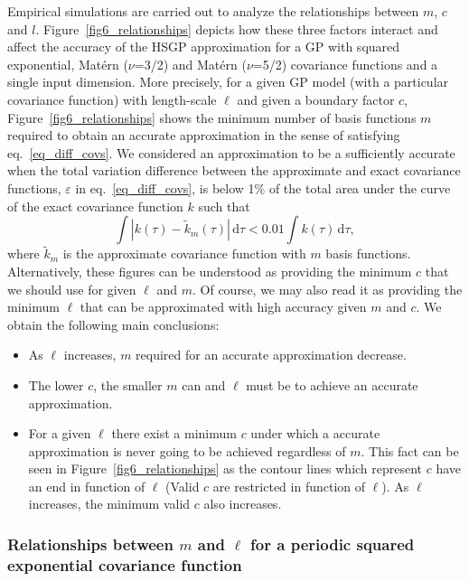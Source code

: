 Empirical simulations are carried out to analyze the relationships between $m$, $c$ and $l$. Figure~\ref{fig6_relationships} depicts how these three factors interact and affect the accuracy of the HSGP approximation for a GP with squared exponential, Mat\'ern ($\nu$=3/2) and Mat\'ern ($\nu$=5/2) covariance functions and a single input dimension. More precisely, for a given GP model (with a particular covariance function) with length-scale $\ell$ and given a boundary factor $c$, Figure~\ref{fig6_relationships} shows the minimum number of basis functions $m$ required to obtain an accurate approximation in the sense of satisfying eq.~\eqref{eq_diff_covs}. We considered an approximation to be a sufficiently accurate when the total variation difference between the approximate and exact covariance functions, $\varepsilon$ in eq.~\eqref{eq_diff_covs}, is below 1$\%$ of the total area under the curve of the exact covariance function $k$ such that
%
\begin{equation} \label{eq:rel_total_distance}
 \int | k(\tau) - \tilde{k}_m(\tau)|  \,\mathrm{d}\tau  < 0.01 \int k(\tau) \,\mathrm{d}\tau,
\end{equation}
%
where $\tilde{k}_m$ is the approximate covariance function with $m$ basis functions. Alternatively, these figures can be understood as providing the minimum $c$ that we should use for given $\ell$ and $m$. Of course, we may also read it as providing the minimum $\ell$ that can be approximated with high accuracy given $m$ and $c$. We obtain the following main conclusions:
%
\begin{itemize}
\item As $\ell$ increases, $m$ required for an accurate approximation decrease.
\item The lower $c$, the smaller $m$ can and $\ell$ must be to achieve an accurate approximation.
\item For a given $\ell$ there exist a minimum $c$ under which a accurate approximation is never going to be achieved regardless of $m$. This fact can be seen in Figure~\ref{fig6_relationships} as the contour lines which represent $c$ have an end in function of $\ell$ (Valid $c$ are restricted in function of $\ell$). As $\ell$ increases, the minimum valid $c$ also increases.
\end{itemize}

\subsubsection{Relationships between $m$ and $\ell$ for a periodic squared exponential covariance function} \label{subsec_empiric_relations_periodic}

